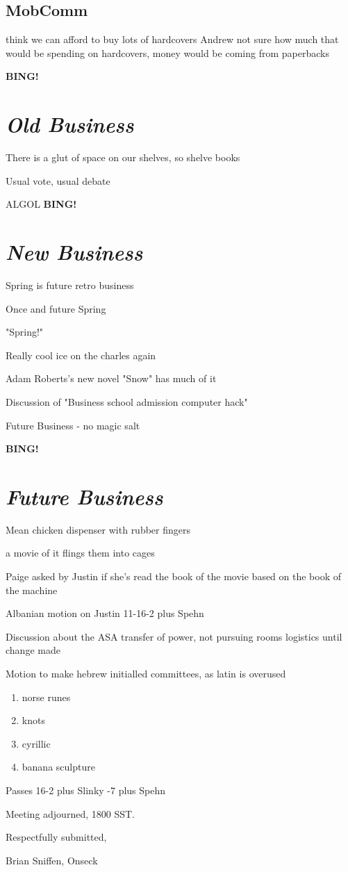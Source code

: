 \documentclass[10pt]{article}
\newcommand{\bing}{{\bf BING!} }
\newcommand{\goto}[1]{\bing \vskip 12pt \section*{{\em{#1}}}}
\newcommand{\ps}{ plus Spehn\xspace}
\begin{document}
\subsection*{MobComm}
think we can afford to buy lots of hardcovers
Andrew not sure how much that would be spending on hardcovers, money would be coming from paperbacks

\goto{Old Business}

There is a glut of space on our shelves, so shelve books

Usual vote, usual debate

ALGOL
\goto{New Business}

Spring is future retro business

Once and future Spring

"Spring!"

Really cool ice on the charles again

Adam Roberts's new novel "Snow" has much of it

Discussion of "Business school admission computer hack"

Future Business - no magic salt

\goto{Future Business}

Mean chicken dispenser with rubber fingers

a movie of it flings them into cages

Paige asked by Justin if she's read the book of the movie based on the book of the machine

Albanian motion on Justin 11-16-2\ps

Discussion about the ASA transfer of power,
not pursuing rooms logistics until change made

Motion to make hebrew initialled committees, as latin is overused
\begin{enumerate}
\item norse runes
\item knots
\item cyrillic
\item banana sculpture
\end{enumerate}

Passes 16-2 plus Slinky -7\ps

\vspace{12pt}

\noindent
Meeting adjourned, 1800 SST.

\vspace{18pt}

\centerline{Respectfully submitted,}
\centerline{Brian Sniffen, Onseck}
\end{document}
